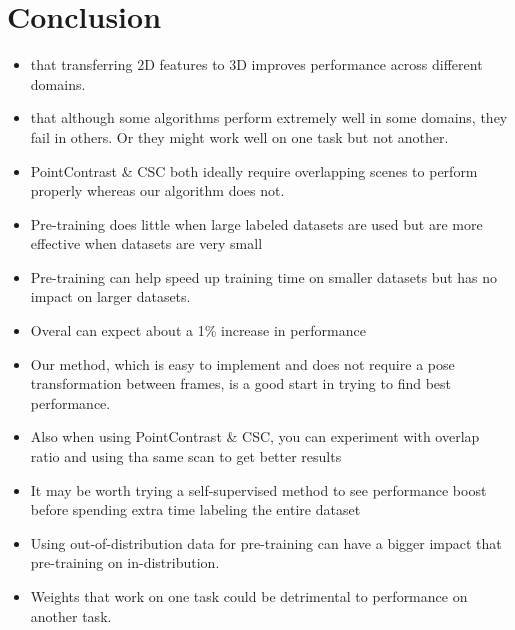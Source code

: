 \documentclass[10pt,twocolumn,letterpaper]{article}
\begin{document}
\begin{table}[t!]
    \centering
    \caption{Object Detection using VoteNet  (mAP)}
\end{table}

\section{Conclusion}

\begin{itemize}
    \item that transferring 2D features to 3D improves performance across different domains.
    \item that although some algorithms perform extremely well in some domains, they fail in others. Or they might work well on one task but not another.
    \item PointContrast \& CSC both ideally require overlapping scenes to perform properly whereas our algorithm does not.
    \item Pre-training does little when large labeled datasets are used but are more effective when datasets are very small
    \item Pre-training can help speed up training time on smaller datasets but has no impact on larger datasets.
    \item Overal can expect about a 1\% increase in performance
    \item Our method, which is easy to implement and does not require a pose transformation between frames, is a good start in trying to find best performance.
    \item Also when using PointContrast \& CSC, you can experiment with overlap ratio and using tha same scan to get better results
    \item It may be worth trying a self-supervised method to see performance boost before spending extra time labeling the entire dataset
    \item Using out-of-distribution data for pre-training can have a bigger impact that pre-training on in-distribution.
    \item Weights that work on one task could be detrimental to performance on another task.
\end{itemize}
\end{document}
